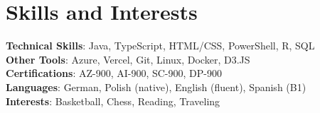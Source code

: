 \documentclass[letterpaper,11pt]{article}
\begin{document}
%
\section{Skills and Interests}
 \begin{itemize}[leftmargin=0.15in, label={}]
    \small{\item{
     \textbf{Technical Skills}{: Java, TypeScript, HTML/CSS, PowerShell, R, SQL} \\
     \textbf{Other Tools}{: Azure, Vercel, Git, Linux, Docker, D3.JS} \\
     \textbf{Certifications}{: AZ-900, AI-900, SC-900, DP-900} \\
     \textbf{Languages}{: German, Polish (native), English (fluent), Spanish (B1)} \\
     \textbf{Interests}{: Basketball, Chess, Reading, Traveling}
    }}
 \end{itemize}


\end{document}
